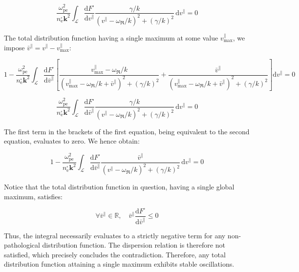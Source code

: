 \begin{equation}
    \frac{\omega_\text{pe}^2}{n_\text{e}^\square\mathbf{k}^2}\int_{\mathcal{L}}\frac{\mathrm{d}F^\square}{\mathrm{d}v^\parallel}\frac{\gamma/k}{\left(v^\parallel-\omega_\Re/k\right)^2+\left(\gamma/k\right)^2}\,\mathrm{d}v^\parallel=0
\end{equation}

The total distribution function having a single maximum at some value $v^\parallel_\text{max}$, we impose $\bar{v}^\parallel=v^\parallel-v^\parallel_\text{max}$:

\begin{equation}
    1-\frac{\omega_\text{pe}^2}{n_\text{e}^\square\mathbf{k}^2}\int_{\mathcal{L}}{\frac{\mathrm{d}F^\square}{\mathrm{d}\bar{v}^\parallel}}\left[\frac{v^\parallel_\text{max}-\omega_\Re/k}{\left(v^\parallel_\text{max}-\omega_\Re/k+\bar{v}^\parallel\right)^2+\left(\gamma/k\right)^2}+\frac{\bar{v}^\parallel}{\left(v^\parallel_\text{max}-\omega_\Re/k+\bar{v}^\parallel\right)^2+\left(\gamma/k\right)^2}\right]\mathrm{d}v^\parallel=0
\end{equation}

\begin{equation}
    \frac{\omega_\text{pe}^2}{n_\text{e}^\square\mathbf{k}^2}\int_{\mathcal{L}}\frac{\mathrm{d}F^\square}{\mathrm{d}\bar{v}^\parallel}\frac{\gamma/k}{\left(v^\parallel-\omega_\Re/k\right)^2+\left(\gamma/k\right)^2}\,\mathrm{d}v^\parallel=0
\end{equation}

The first term in the brackets of the first equation, being equivalent to the second equation, evaluates to zero. We hence obtain:

\begin{equation}
    1-\frac{\omega_\text{pe}^2}{n_\text{e}^\square\mathbf{k}^2}\int_{\mathcal{L}}\frac{\mathrm{d}F^\square}{\mathrm{d}\bar{v}^\parallel}\frac{\bar{v}^\parallel}{\left(v^\parallel-\omega_\Re/k\right)^2+\left(\gamma/k\right)^2}\,\mathrm{d}v^\parallel=0
\end{equation}

Notice that the total distribution function in question, having a single global maximum, satisfies:

\begin{equation}
    \forall\bar{v}^\parallel\in\mathbb{R},\quad\bar{v}^\parallel\frac{\mathrm{d}F^\square}{\mathrm{d}\bar{v}^\parallel}\leq0
\end{equation}

Thus, the integral necessarily evaluates to a strictly negative term for any non-pathological distribution function. The dispersion relation is therefore not satisfied, which precisely concludes the contradiction. Therefore, any total distribution function attaining a single maximum exhibits stable oscillations.

